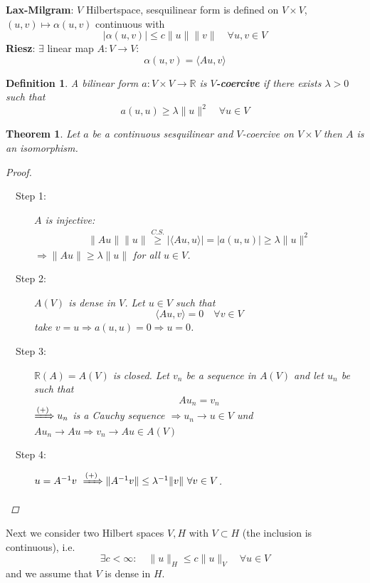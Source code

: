 \documentclass[12pt]{extreport} %
\newcommand{\R}{\mathbb{R}}
\theoremstyle{named}
\theoremstyle{nnamed}
\theoremstyle{itshape}
\newtheorem{definition}{Definition}  \counterwithin{definition}{chapter}
\newtheorem{theorem}{Theorem}  \counterwithin{theorem}{chapter}
\theoremstyle{normal}
\begin{document}
\textbf{Lax-Milgram}: $V$ Hilbertspace, sesquilinear form is defined on $V \times V$, $(u, v) \mapsto \alpha (u, v)$ continuous with
$$ \left| \alpha (u, v) \right| \leq c \| u \| \|v \| \quad \forall u,v \in V $$
\textbf{Riesz}: $\exists$ linear map $A \colon V \rightarrow V$:
$$ \alpha(u, v ) = \langle A u, v \rangle $$

\begin{definition}
	A bilinear form $a \colon V \times V \rightarrow \R$ is \textbf{$V$-coercive} if there exists $\lambda > 0$ such that
	$$ a\left( u, u \right) \geq \lambda \| u \|^2 \quad \forall u \in V $$
\end{definition}

\begin{theorem}
	Let $a$ be a continuous sesquilinear and $V$-coercive on $V \times V$ then $A$ is an isomorphism.
	
	\begin{proof} ~\
		\begin{description}
			\item[~\hspace{0.25em}~Step 1:] $A$ is injective:
				\begin{align*}
					\| Au \| \| u \| \overset{C.S.}{\geq} \left| \langle A u, u \rangle \right| = \left| a(u, u) \right| \geq \lambda \| u \|^2 \tag*{$(+)$}
				\end{align*}  
				$\Rightarrow \| A u\| \geq \lambda \| u \|$ for all $u \in V$.
			\item[~\hspace{0.25em}~Step 2:] $A(V)$ is dense in $V$. Let $u \in V$ such that 
				$$ \langle A u, v \rangle = 0 \quad \forall v \in V $$
				take $v = u \Rightarrow a(u, u) = 0 \Rightarrow u = 0$. 
			\item[~\hspace{0.25em}~Step 3:] $\R(A) = A(V)$ is closed. Let $v_n$ be a sequence in $A(V)$ and let $u_n$ be such that
				$$ A u_n = v_n $$
				$\xRightarrow[]{(+)} u_n$ is a Cauchy sequence $\Rightarrow u_n \rightarrow u \in V$ und $A u_n \rightarrow A u \Rightarrow v_n \rightarrow A u \in A(V)$
			\item[~\hspace{0.25em}~Step 4:] $u = A^{-1} v \xRightarrow[]{(+)} \|A^{-1} v \| \leq \lambda^{-1} \| v \| ~\forall v \in V$. 
		\end{description}
	\end{proof}
\end{theorem}

Next we consider two Hilbert spaces $V, H$ with $V \subset H$ (the inclusion is continuous), i.e.
$$ \exists c < \infty \colon \quad \| u \|_H \leq c \| u \|_V \quad \forall u \in V $$
and we assume that $V$ is dense in $H$.
\end{document}
